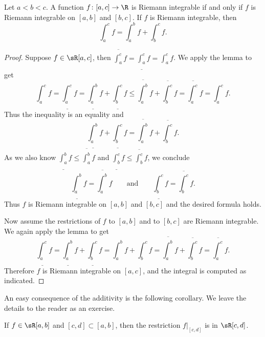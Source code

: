 \documentclass[12pt]{book}
\begin{document}
\begin{thm}
Let $a < b < c$.
A function $f \colon [a,c] \to \R$ is Riemann integrable
if and only if $f$ is Riemann integrable on $[a,b]$ and $[b,c]$.
If
$f$ is Riemann integrable, then
\begin{equation*}
\int_a^c f
=
\int_a^b f
+
\int_b^c f .
\end{equation*}
\end{thm}

\begin{proof}
Suppose $f \in \sR[a,c]$, then 
$\overline{\int_a^c} f = 
\underline{\int_a^c} f = 
\int_a^c f$.
We apply the lemma to get
\begin{equation*}
\int_a^c f
=
\underline{\int_a^c} f
 =
\underline{\int_a^b} f + \underline{\int_b^c} f
 \leq
\overline{\int_a^b} f + \overline{\int_b^c} f
 =
\overline{\int_a^c} f
 =
\int_a^c f .
\end{equation*}
Thus the inequality is an equality and
\begin{equation*}
\underline{\int_a^b} f + \underline{\int_b^c} f
=
\overline{\int_a^b} f + \overline{\int_b^c} f .
\end{equation*}
As we also know 
$\underline{\int_a^b} f \leq \overline{\int_a^b} f$
and
$\underline{\int_b^c} f \leq \overline{\int_b^c} f$, we 
conclude 
\begin{equation*}
\underline{\int_a^b} f
=
\overline{\int_a^b} f
\qquad \text{and} \qquad
\underline{\int_b^c} f
=
\overline{\int_b^c} f .
\end{equation*}
Thus $f$ is Riemann integrable on $[a,b]$ and $[b,c]$ and the desired formula
holds.

Now assume the restrictions of $f$ to $[a,b]$ and to $[b,c]$
are Riemann integrable.
We again apply the lemma to get
\begin{equation*}
\underline{\int_a^c} f
=
\underline{\int_a^b} f + \underline{\int_b^c} f
=
\int_a^b f + \int_b^c f
=
\overline{\int_a^b} f + \overline{\int_b^c} f
=
\overline{\int_a^c} f .
\end{equation*}
Therefore $f$ is Riemann integrable on $[a,c]$, and the integral is computed
as indicated.
\end{proof}

An easy consequence of the additivity is the following corollary.
We
leave the details to the reader as an exercise.

\begin{cor} \label{intsubcor}
If $f \in \sR[a,b]$ and
$[c,d] \subset [a,b]$, then
the restriction $f|_{[c,d]}$ is in $\sR[c,d]$.
\end{cor}
\end{document}
